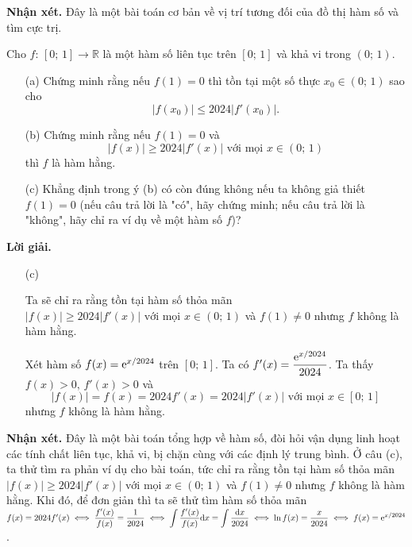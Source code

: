 \textbf{Nhận xét. }Đây là một bài toán cơ bản về vị trí tương đối của đồ thị hàm số và tìm cực trị.

\begin{tcolorbox}[title=\textbf{Bài toán B.4.},breakable]
    Cho $f:\,[0;\,1] \to \mathbb{R}$ là một hàm số liên tục trên $[0;\,1]$ và khả vi trong $(0;\,1)$.

    \begin{enumerate}
        \item[(a)] {Chứng minh rằng nếu $f(1) = 0$ thì tồn tại một số thực $x_0 \in (0;\,1)$ sao cho $$|f(x_0)| \leq 2024|f'(x_0)|.$$}
        \item[(b)] {Chứng minh rằng nếu $f(1) = 0$ và $$|f(x)| \geq 2024|f'(x)|\text{ với mọi }x \in (0;\,1)$$ thì $f$ là hàm hằng.}
        \item[(c)] {Khẳng định trong ý (b) có còn đúng không nếu ta không giả thiết $f(1) = 0$ (nếu câu trả lời là "có", hãy chứng minh; nếu câu trả lời là "không", hãy chỉ ra ví dụ về một hàm số $f$)?}  
    \end{enumerate}
\end{tcolorbox}

\textbf{Lời giải. }

\begin{enumerate}
    \item[(c)] {Ta sẽ chỉ ra rằng tồn tại hàm số thỏa mãn $|f(x)| \geq 2024|f'(x)|\text{ với mọi }x \in (0;\,1)$ và $f(1) \ne 0$ nhưng $f$ không là hàm hằng.
    
    Xét hàm số $f(x) = {\rm e}^{x/2024}$ trên $[0;\,1]$. Ta có $f'(x) = \dfrac{{\rm e}^{x/2024}}{2024}$. Ta thấy $f(x) > 0,\,f'(x) > 0$ và $$|f(x)| = f(x) = 2024f'(x) = 2024|f'(x)|\text{ với mọi }x \in [0;\,1]$$ nhưng $f$ không là hàm hằng.} 
\end{enumerate}

\textbf{Nhận xét. }Đây là một bài toán tổng hợp về hàm số, đòi hỏi vận dụng linh hoạt các tính chất liên tục, khả vi, bị chặn cùng với các định lý trung bình. Ở câu (c), ta thử tìm ra phản ví dụ cho bài toán, tức chỉ ra rằng tồn tại hàm số thỏa mãn $|f(x)| \geq 2024|f'(x)|\text{ với mọi }x \in (0;\,1)$ và $f(1) \ne 0$ nhưng $f$ không là hàm hằng. Khi đó, để đơn giản thì ta sẽ thử tìm hàm số thỏa mãn $f(x) = 2024f'(x) \iff \dfrac{f'(x)}{f(x)} = \dfrac{1}{2024} \iff \displaystyle\int\dfrac{f'(x)}{f(x)}\mathrm{d}x = \displaystyle\int\dfrac{\mathrm{d}x}{2024} \iff \ln f(x) = \dfrac{x}{2024} \iff f(x) = {\rm e}^{x/2024}$. 

